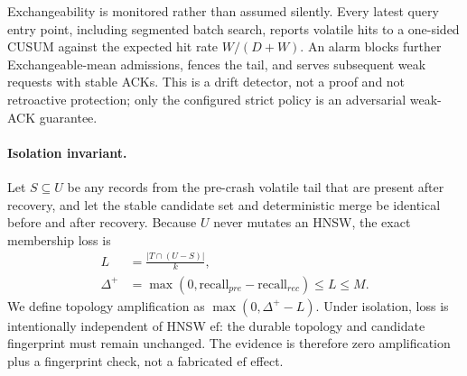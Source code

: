 \documentclass[sigconf,nonacm,balance=false]{acmart}
\begin{document}
Exchangeability is monitored rather than assumed silently. Every latest query
entry point, including segmented batch search,
reports volatile hits to a one-sided CUSUM against the expected hit rate
$W/(D+W)$. An alarm blocks further Exchangeable-mean admissions, fences the tail,
and serves subsequent weak requests with stable ACKs. This is a drift detector,
not a proof and not retroactive protection; only the configured strict policy is
an adversarial weak-ACK guarantee.

\paragraph{Isolation invariant.} Let $S\subseteq U$ be any records from the
pre-crash volatile tail that are present after recovery, and let the stable
candidate set and deterministic merge be identical before and after recovery.
Because $U$ never mutates an HNSW, the exact membership loss is
\[
\begin{aligned}
 L&=\frac{|T\cap(U-S)|}{k},\\
 \Delta^+&=\max(0,\mathrm{recall}_{pre}-\mathrm{recall}_{rec})\le L\le M.
\end{aligned}
\]
We define topology amplification as $\max(0,\Delta^+-L)$. Under isolation, loss
is intentionally independent of HNSW $\mathrm{ef}$: the durable topology and
candidate fingerprint must remain unchanged. The evidence is therefore zero
amplification plus a fingerprint check, not a fabricated $\mathrm{ef}$ effect.
\end{document}
